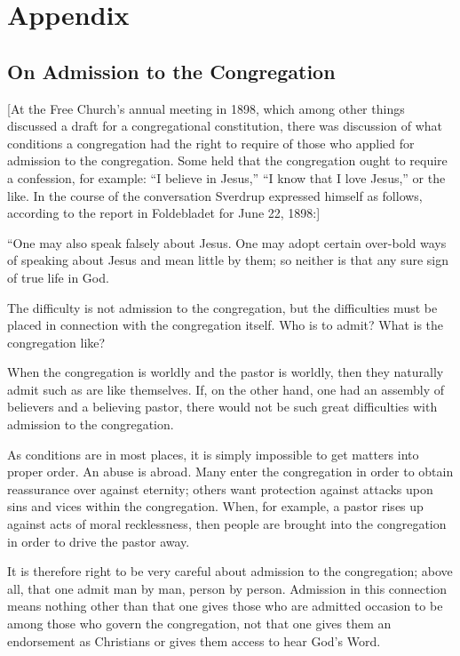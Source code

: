 
\section{Appendix}

\subsection{On Admission to the Congregation}

[At the Free Church’s annual meeting in 1898, which among other things discussed a draft for a congregational constitution, there was discussion of what conditions a congregation had the right to require of those who applied for admission to the congregation. Some held that the congregation ought to require a confession, for example: “I believe in Jesus,” “I know that I love Jesus,” or the like. In the course of the conversation Sverdrup expressed himself as follows, according to the report in Foldebladet for June 22, 1898:]

“One may also speak falsely about Jesus. One may adopt certain over-bold ways of speaking about Jesus and mean little by them; so neither is that any sure sign of true life in God.

The difficulty is not admission to the congregation, but the difficulties must be placed in connection with the congregation itself. Who is to admit? What is the congregation like?

When the congregation is worldly and the pastor is worldly, then they naturally admit such as are like themselves. If, on the other hand, one had an assembly of believers and a believing pastor, there would not be such great difficulties with admission to the congregation.

As conditions are in most places, it is simply impossible to get matters into proper order. An abuse is abroad. Many enter the congregation in order to obtain reassurance over against eternity; others want protection against attacks upon sins and vices within the congregation. When, for example, a pastor rises up against acts of moral recklessness, then people are brought into the congregation in order to drive the pastor away.

It is therefore right to be very careful about admission to the congregation; above all, that one admit man by man, person by person. Admission in this connection means nothing other than that one gives those who are admitted occasion to be among those who govern the congregation, not that one gives them an endorsement as Christians or gives them access to hear God’s Word.

